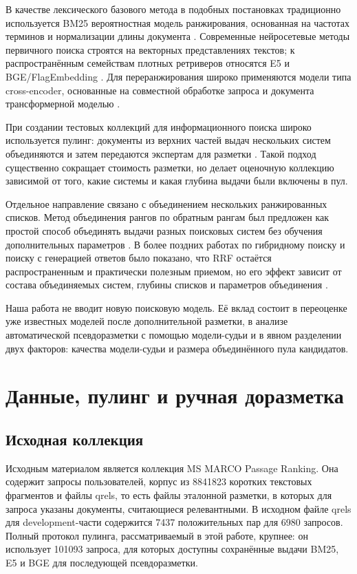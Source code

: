 \documentclass[runningheads,a4paper]{llncs}
\begin{document}
В качестве лексического базового метода в подобных постановках традиционно используется BM25 \textemdash{} вероятностная модель ранжирования, основанная на частотах терминов и нормализации длины документа \cite{robertson2009bm25}. Современные нейросетевые методы первичного поиска строятся на векторных представлениях текстов; к распространённым семействам плотных ретриверов относятся E5 \cite{wang2022e5} и BGE/FlagEmbedding \cite{xiao2023cpack}. Для переранжирования широко применяются модели типа cross-encoder, основанные на совместной обработке запроса и документа трансформерной моделью \cite{nogueira2019bert}.

При создании тестовых коллекций для информационного поиска широко используется пулинг: документы из верхних частей выдач нескольких систем объединяются и затем передаются экспертам для разметки \cite{voorhees2005trec}. Такой подход существенно сокращает стоимость разметки, но делает оценочную коллекцию зависимой от того, какие системы и какая глубина выдачи были включены в пул.

Отдельное направление связано с объединением нескольких ранжированных списков. Метод объединения рангов по обратным рангам был предложен как простой способ объединять выдачи разных поисковых систем без обучения дополнительных параметров \cite{cormack2009rrf}. В более поздних работах по гибридному поиску и поиску с генерацией ответов было показано, что RRF остаётся распространенным и практически полезным приемом, но его эффект зависит от состава объединяемых систем, глубины списков и параметров объединения \cite{bruch2023fusion,mackenzie2023anserini,rackauckas2024ragfusion}.

Наша работа не вводит новую поисковую модель. Её вклад состоит в переоценке уже известных моделей после дополнительной разметки, в анализе автоматической псевдоразметки с помощью модели-судьи и в явном разделении двух факторов: качества модели-судьи и размера объединённого пула кандидатов.

\section{Данные, пулинг и ручная доразметка}

\subsection{Исходная коллекция}

Исходным материалом является коллекция MS MARCO Passage Ranking. Она содержит запросы пользователей, корпус из 8841823 коротких текстовых фрагментов и файлы qrels, то есть файлы эталонной разметки, в которых для запроса указаны документы, считающиеся релевантными. В исходном файле qrels для development-части содержится 7437 положительных пар для 6980 запросов. Полный протокол пулинга, рассматриваемый в этой работе, крупнее: он использует 101093 запроса, для которых доступны сохранённые выдачи BM25, E5 и BGE для последующей псевдоразметки.
\end{document}
